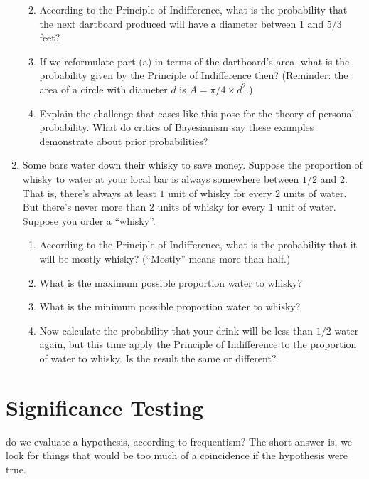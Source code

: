 \documentclass[justified]{tufte-book}
\providecommand{\tightlist}{%
  \setlength{\itemsep}{0pt}\setlength{\parskip}{0pt}}
\theoremstyle{definition}
\theoremstyle{definition}
\theoremstyle{definition}
\theoremstyle{remark}
\begin{document}
\begin{enumerate}
  \begin{enumerate}
  \def\labelenumii{\alph{enumii}.}
  \tightlist
  \item
    According to the Principle of Indifference, what is the probability
    that the next dartboard produced will have a diameter between \(1\)
    and \(5/3\) feet?
  \item
    If we reformulate part (a) in terms of the dartboard's area, what is
    the probability given by the Principle of Indifference then?
    (Reminder: the area of a circle with diameter \(d\) is
    \(A = \pi/4 \times d^2\).)
  \item
    Explain the challenge that cases like this pose for the theory of
    personal probability. What do critics of Bayesianism say these
    examples demonstrate about prior probabilities?
  \end{enumerate}
\item
  Some bars water down their whisky to save money. Suppose the
  proportion of whisky to water at your local bar is always somewhere
  between \(1/2\) and \(2\). That is, there's always at least \(1\) unit
  of whisky for every \(2\) units of water. But there's never more than
  \(2\) units of whisky for every \(1\) unit of water. Suppose you order
  a ``whisky''.

  \begin{enumerate}
  \def\labelenumii{\alph{enumii}.}
  \tightlist
  \item
    According to the Principle of Indifference, what is the probability
    that it will be mostly whisky? (``Mostly'' means more than half.)
  \item
    What is the maximum possible proportion water to whisky?
  \item
    What is the minimum possible proportion water to whisky?
  \item
    Now calculate the probability that your drink will be less than
    \(1/2\) water again, but this time apply the Principle of
    Indifference to the proportion of water to whisky. Is the result the
    same or different?
  \end{enumerate}
\end{enumerate}

\hypertarget{significance-testing}{%
\chapter{Significance Testing}\label{significance-testing}}

 do we evaluate a hypothesis, according to frequentism?
The short answer is, we look for things that would be too much of a
coincidence if the hypothesis were true.
\end{document}
